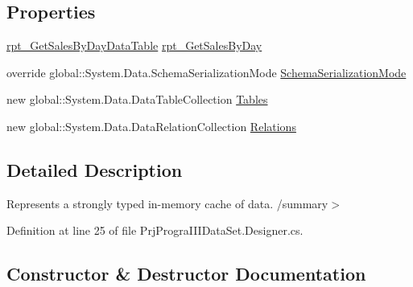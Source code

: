 \subsection*{Properties}
\begin{DoxyCompactItemize}
\item 
\hyperlink{classprj_progra_i_i_i_1_1_prj_progra_i_i_i_data_set_1_1rpt___get_sales_by_day_data_table}{rpt\+\_\+\+Get\+Sales\+By\+Day\+Data\+Table} \hyperlink{classprj_progra_i_i_i_1_1_prj_progra_i_i_i_data_set_a1234c1cfa78b6c2add509b6aa81fc769}{rpt\+\_\+\+Get\+Sales\+By\+Day}
\item 
override global\+::\+System.\+Data.\+Schema\+Serialization\+Mode \hyperlink{classprj_progra_i_i_i_1_1_prj_progra_i_i_i_data_set_af16a178de369ee71e88ff6a27756a156}{Schema\+Serialization\+Mode}
\item 
new global\+::\+System.\+Data.\+Data\+Table\+Collection \hyperlink{classprj_progra_i_i_i_1_1_prj_progra_i_i_i_data_set_a2448ccb1b6a4be8af285aacb89bdf544}{Tables}
\item 
new global\+::\+System.\+Data.\+Data\+Relation\+Collection \hyperlink{classprj_progra_i_i_i_1_1_prj_progra_i_i_i_data_set_af33da0ed81cd58ea86643f3473273a0d}{Relations}
\end{DoxyCompactItemize}


\subsection{Detailed Description}
Represents a strongly typed in-\/memory cache of data. /summary$>$ 

Definition at line 25 of file Prj\+Progra\+I\+I\+I\+Data\+Set.\+Designer.\+cs.



\subsection{Constructor \& Destructor Documentation}
\hypertarget{classprj_progra_i_i_i_1_1_prj_progra_i_i_i_data_set_a6f9d23a27fd935aa75948728c44e0ab7}{}\label{classprj_progra_i_i_i_1_1_prj_progra_i_i_i_data_set_a6f9d23a27fd935aa75948728c44e0ab7} 
